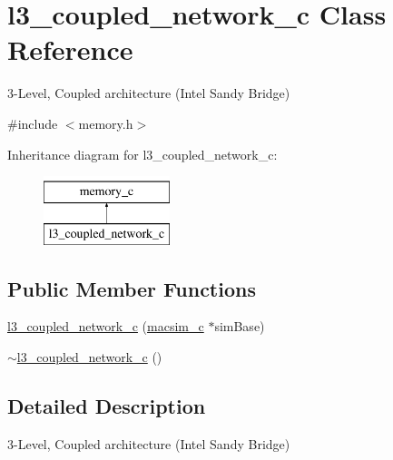 \hypertarget{classl3__coupled__network__c}{
\section{l3\_\-coupled\_\-network\_\-c Class Reference}
\label{classl3__coupled__network__c}
}


3-\/Level, Coupled architecture (Intel Sandy Bridge)  




{\ttfamily \#include $<$memory.h$>$}

Inheritance diagram for l3\_\-coupled\_\-network\_\-c:\begin{figure}[H]
\begin{center}
\leavevmode
\includegraphics[height=2.000000cm]{classl3__coupled__network__c}
\end{center}
\end{figure}
\subsection*{Public Member Functions}
\begin{DoxyCompactItemize}
\item 
\hyperlink{classl3__coupled__network__c_acce488887d4a317807384144b34deeb6}{l3\_\-coupled\_\-network\_\-c} (\hyperlink{classmacsim__c}{macsim\_\-c} $\ast$simBase)
\item 
\hyperlink{classl3__coupled__network__c_a31117e8df70c5019f948cdf7416e2348}{$\sim$l3\_\-coupled\_\-network\_\-c} ()
\end{DoxyCompactItemize}


\subsection{Detailed Description}
3-\/Level, Coupled architecture (Intel Sandy Bridge) 


